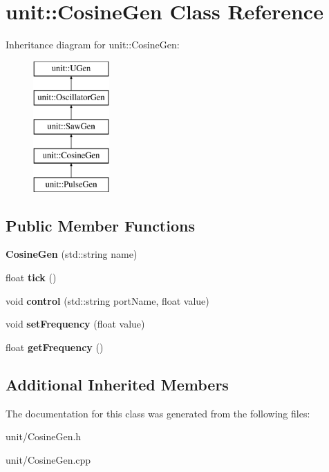 \hypertarget{classunit_1_1CosineGen}{}\section{unit\+:\+:Cosine\+Gen Class Reference}
\label{classunit_1_1CosineGen}
Inheritance diagram for unit\+:\+:Cosine\+Gen\+:\begin{figure}[H]
\begin{center}
\leavevmode
\includegraphics[height=5.000000cm]{classunit_1_1CosineGen}
\end{center}
\end{figure}
\subsection*{Public Member Functions}
\begin{DoxyCompactItemize}
\item 
{\bfseries Cosine\+Gen} (std\+::string name)\hypertarget{classunit_1_1CosineGen_a1eb4aa0471f337e95653d91e550f58cb}{}\label{classunit_1_1CosineGen_a1eb4aa0471f337e95653d91e550f58cb}

\item 
float {\bfseries tick} ()\hypertarget{classunit_1_1CosineGen_a4c1ceffaf70b5eae5c4153ee4b93c001}{}\label{classunit_1_1CosineGen_a4c1ceffaf70b5eae5c4153ee4b93c001}

\item 
void {\bfseries control} (std\+::string port\+Name, float value)\hypertarget{classunit_1_1CosineGen_a15411f97b09516de2bf85327615f1784}{}\label{classunit_1_1CosineGen_a15411f97b09516de2bf85327615f1784}

\item 
void {\bfseries set\+Frequency} (float value)\hypertarget{classunit_1_1CosineGen_aebdf5bbd7a0614f3a3cd2ae0d8602b32}{}\label{classunit_1_1CosineGen_aebdf5bbd7a0614f3a3cd2ae0d8602b32}

\item 
float {\bfseries get\+Frequency} ()\hypertarget{classunit_1_1CosineGen_a2865a158e86e8e85ac2c4d686de65fce}{}\label{classunit_1_1CosineGen_a2865a158e86e8e85ac2c4d686de65fce}

\end{DoxyCompactItemize}
\subsection*{Additional Inherited Members}


The documentation for this class was generated from the following files\+:\begin{DoxyCompactItemize}
\item 
unit/Cosine\+Gen.\+h\item 
unit/Cosine\+Gen.\+cpp\end{DoxyCompactItemize}
